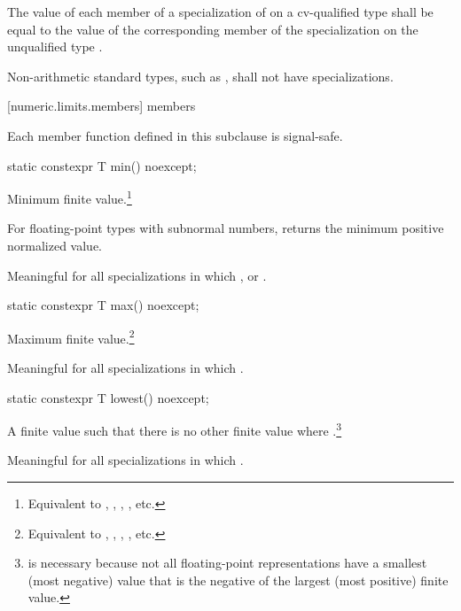 \pnum
The value of each member of a specialization of
 on a cv-qualified type
 shall be equal to the value of the corresponding member of
the specialization on the unqualified type .

\pnum
Non-arithmetic standard types, such as
, shall not have specializations.

[numeric.limits.members]{ members}

\pnum
{}%
Each member function defined in this subclause is signal-safe.

%
\begin{itemdecl}
static constexpr T min() noexcept;
\end{itemdecl}

\begin{itemdescr}
\pnum
Minimum finite value.\footnote{Equivalent to , ,
, , etc.}

%
\pnum
For floating-point types with subnormal numbers, returns the minimum positive
normalized value.

\pnum
Meaningful for all specializations in which
,
or
.
\end{itemdescr}

%
\begin{itemdecl}
static constexpr T max() noexcept;
\end{itemdecl}

\begin{itemdescr}
\pnum
Maximum finite value.\footnote{Equivalent to , ,
, , etc.}

\pnum
Meaningful for all specializations in which
.
\end{itemdescr}

%
\begin{itemdecl}
static constexpr T lowest() noexcept;
\end{itemdecl}

\begin{itemdescr}
\pnum
A finite value  such that there is no other finite
value  where .\footnote{ is necessary because not all
floating-point representations have a smallest (most negative) value that is
the negative of the largest (most positive) finite value.}

\pnum
Meaningful for all specializations in which .
\end{itemdescr}

